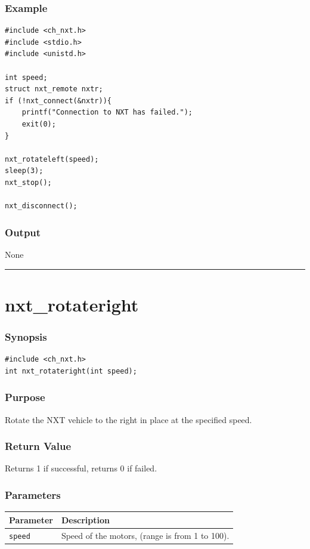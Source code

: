 \documentclass[12pt]{article}
\begin{document}
\subsubsection*{Example}
\begin{verbatim}
#include <ch_nxt.h> 
#include <stdio.h>
#include <unistd.h>

int speed;
struct nxt_remote nxtr;
if (!nxt_connect(&nxtr)){
    printf("Connection to NXT has failed.");
    exit(0);
}
    
nxt_rotateleft(speed);
sleep(3);
nxt_stop();

nxt_disconnect();
\end{verbatim}

\subsubsection*{Output}
None 
\\

\hrule
\newpage

\section*{nxt\_rotateright}

\subsubsection*{Synopsis}
\begin{verbatim}
#include <ch_nxt.h>
int nxt_rotateright(int speed);
\end{verbatim}

\subsubsection*{Purpose}
Rotate the NXT vehicle to the right in place at the specified speed.

\subsubsection*{Return Value}
Returns 1 if successful, returns 0 if failed.

\subsubsection*{Parameters}
\begin{tabular}{ l | p{12cm} }
Parameter			& Description\\ \hline
\verb+speed+	    & Speed of the motors, (range is from 1 to 100).
\end{tabular}
\end{document}
